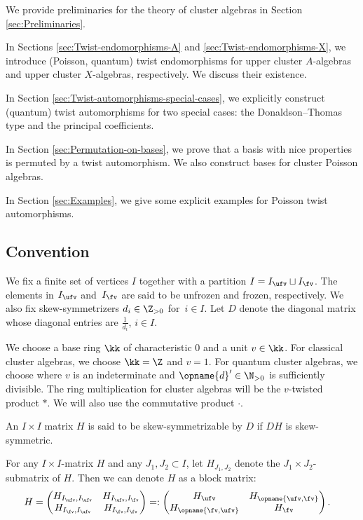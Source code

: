 \documentclass[pdftex]{sigma}
\newcommand{\Iufv}{I_{\ufv}}
\newcommand{\Ifv}{I_{\fv}}
\renewcommand{\diag}{\opname{d}'}
\renewcommand{\Diag}{D}
\newcommand{\high}{\opname{\ufv,\fv}}
\newcommand{\low}{\opname{\fv,\ufv}}
\numberwithin{equation}{section}
\begin{document}
We provide preliminaries for the theory of cluster algebras in Section
\ref{sec:Preliminaries}.

In Sections \ref{sec:Twist-endomorphisms-A} and \ref{sec:Twist-endomorphisms-X},
we introduce (Poisson, quantum) twist endomorphisms for upper cluster $A$-algebras
and upper cluster $X$-algebras, respectively. We discuss their existence.

In Section \ref{sec:Twist-automorphisms-special-cases}, we explicitly
construct (quantum) twist automorphisms for two special cases: the Donaldson--Thomas
type and the principal coefficients.

In Section \ref{sec:Permutation-on-bases}, we prove that a basis
with nice properties is permuted by a twist automorphism. We also construct bases for cluster Poisson algebras.

In Section \ref{sec:Examples}, we give some explicit examples for
Poisson twist automorphisms.

\subsection{Convention}

We fix a finite set of vertices $I$ together with a partition $I=I_{\ufv}\sqcup I_{\fv}$.
The elements in $I_{\ufv}$ and~$I_{\fv}$ are said to be unfrozen
and frozen, respectively. We also fix skew-symmetrizers $d_{i}\in\Z_{>0}$
for~$i\in I$. Let
$\Diag$ denote the diagonal matrix whose diagonal entries are $\frac{1}{d_{i}}$, $i\in I$.

We choose a base ring $\kk$ of characteristic
$0$ and a unit $v\in \kk$. For classical cluster algebras, we choose $\kk=\Z$ and $v=1$. For quantum cluster algebras, we choose \smash{$\kk=\Z\big[v^{\pm\frac{1}{\diag}}\big]$} where $v$ is an indeterminate and $\diag\in \N_{>0}$ is sufficiently divisible. The ring multiplication for cluster algebras will be the $v$-twisted product $*$. We will also use the commutative product $\cdot$.

An $I\times I$ matrix $H$ is said to be skew-symmetrizable by $\Diag$
if $\Diag H$ is skew-symmetric.

For any $I\times I$-matrix $H$ and any $J_{1},J_{2}\subset I$,
let $H_{J_{1},J_{2}}$ denote the $J_{1}\times J_{2}$-submatrix of
$H$. Then we can denote $H$ as a block matrix:
\begin{align*}
H & =\left(\begin{matrix}
H_{\Iufv,\Iufv} & H_{\Iufv,\Ifv}\\
H_{\Ifv,\Iufv} & H_{\Ifv,\Ifv}
\end{matrix}\right)=:\left(\begin{matrix}
H_{\ufv} & H_{\high}\\
H_{\low} & H_{\fv}
\end{matrix}\right).
\end{align*}
\end{document}
